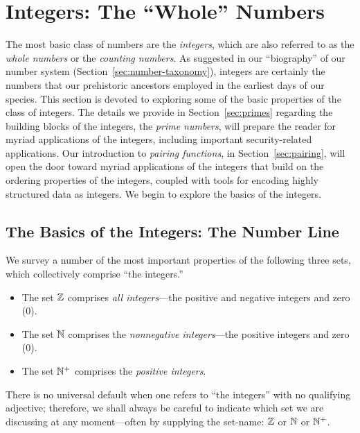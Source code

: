 \section{Integers: The ``Whole'' Numbers}
\label{sec:integers}

The most basic class of numbers are the {\it integers},
which are also referred to as the {\it whole numbers}
or the {\em counting numbers}.
%
As suggested in our ``biography'' of our number system
(Section~\ref{sec:number-taxonomy}), integers are certainly the
numbers that our prehistoric ancestors employed in the earliest days
of our species.  This section is devoted to exploring some of the
basic properties of the class of integers.  The details we provide in
Section~\ref{sec:primes} regarding the building blocks of the
integers, the {\it prime numbers},  will prepare
the reader for myriad applications of the integers, including
important security-related applications.  Our introduction to {\it
  pairing functions},  in
Section~\ref{sec:pairing}, will open the door toward myriad
applications of the integers that build on the ordering properties of
the integers, coupled with tools for encoding highly structured data
as integers.  We begin to explore the basics of the integers.

\subsection{The Basics of the Integers: The Number Line}
\label{sec:integer-number-line}

We survey a number of the most important properties of the following
three sets, which collectively comprise ``the integers.''
\begin{itemize}
\item
The set $\mathbb{Z}$
comprises {\em all integers}---the positive and negative integers and
zero ($0$).
\item
The set $\mathbb{N}$
comprises the {\em nonnegative integers}---the positive integers and
zero ($0$).
\item
The set $\mathbb{N}^+$
comprises the {\em positive integers}.
\end{itemize}
There is no universal default when one refers to ``the integers'' with
no qualifying adjective; therefore, we shall always be careful to
indicate which set we are discussing at any moment---often by
supplying the set-name: $\mathbb{Z}$ or $\mathbb{N}$ or $\mathbb{N}^+$.

